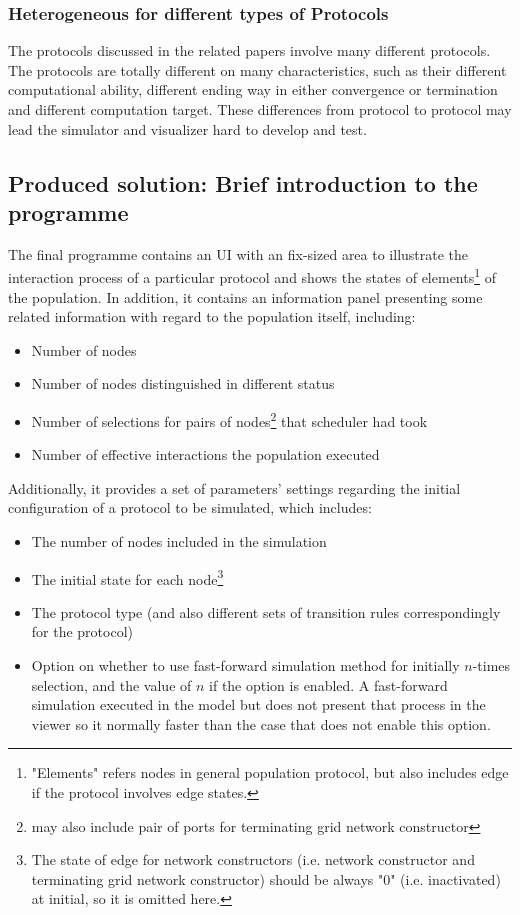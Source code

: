 \subsubsection{Heterogeneous for different types of Protocols}

\par\noindent
The protocols discussed in the related papers \cite{AspnesR2007, MS16a, Mi17} involve
many different protocols. The protocols are totally different on many characteristics,
such as their different computational ability, different ending way in either convergence or termination and different
computation target. These differences from
protocol to protocol may lead the simulator and visualizer hard to develop and test.

\subsection{Produced solution: Brief introduction to the programme}

\par\noindent
The final programme contains an UI with an fix-sized area to illustrate the interaction process of
a particular protocol and shows the states of elements\footnote{\noindent "Elements" refers nodes in general population protocol,
but also includes edge if the protocol involves edge states.} of the population.
In addition, it contains an information panel presenting some related
information with regard to the population itself, including:
\begin{itemize}
  \item Number of nodes
  \item Number of nodes distinguished in different status
  \item Number of selections for pairs of nodes\footnote{may also include pair of ports for terminating grid network constructor} that scheduler had took
  \item Number of effective interactions the population executed
\end{itemize}

\par\noindent
Additionally, it provides a set of parameters' settings regarding the initial configuration of a protocol to be simulated, which includes:
\begin{itemize}
  \item The number of nodes included in the simulation
  \item The initial state for each node\footnote{\noindent The state of edge for network constructors (i.e. network constructor and terminating grid network constructor) should be always "0" (i.e. inactivated) at initial, so it is omitted here.}
  \item The protocol type (and also different sets of transition rules correspondingly for the protocol)
  \item Option on whether to use fast-forward simulation method for initially $n$-times selection, and the value of $n$ if the option is enabled.
  A fast-forward simulation executed in the model but does not present that process in the viewer so it normally faster than the case that does not enable this option.
\end{itemize}

